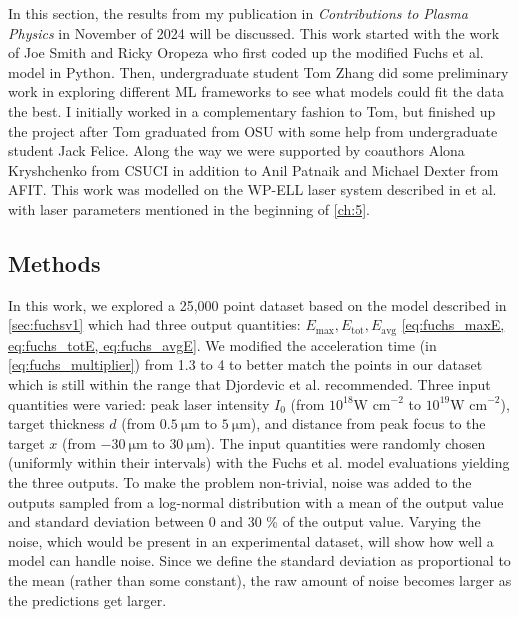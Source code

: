 In this section, the results from my publication in \emph{Contributions to Plasma Physics} \cite{Desai_2024_CPP} in November of 2024 will be discussed. This work started with the work of Joe Smith and Ricky Oropeza who first coded up the modified Fuchs et al. model in Python. Then, undergraduate student Tom Zhang did some preliminary work in exploring different \gls{ML} frameworks to see what models could fit the data the best. I initially worked in a complementary fashion to Tom, but finished up the project after Tom graduated from OSU with some help from undergraduate student Jack Felice. Along the way we were supported by coauthors Alona Kryshchenko from \gls{CSUCI} in addition to Anil Patnaik and Michael Dexter from \gls{AFIT}. This work was modelled on the \gls{WP-ELL} laser system described in et al. \cite{George_2019_HPLSE} with laser parameters mentioned in the beginning of \autoref{ch:5}.

\subsection{Methods}
In this work, we explored a 25,000 point dataset based on the model described in \autoref{sec:fuchsv1} which had three output quantities: $E_\text{max}, E_\text{tot}, E_\text{avg}$ \autoref{eq:fuchs_maxE, eq:fuchs_totE, eq:fuchs_avgE}. We modified the acceleration time (in \autoref{eq:fuchs_multiplier}) from 1.3 to 4 to better match the points in our dataset which is still within the range that Djordevic et al. \cite{Djordjevic_2021_PPCF} recommended.  Three input quantities were varied: peak laser intensity $I_0$ (from  $10^{18} \text{W cm}^{-2}$ to $10^{19} \text{W cm}^{-2}$), target thickness $d$ (from $\SI{0.5}{\micro \meter}$ to $\SI{5}{\micro \meter}$), and distance from peak focus to the target $x$ (from $\SI{-30}{\micro \meter}$ to $\SI{30}{\micro \meter}$). The input quantities were randomly chosen (uniformly within their intervals) with the Fuchs et al. model evaluations yielding the three outputs. To make the problem non-trivial, noise was added to the outputs sampled from a log-normal distribution with a mean of the output value and standard deviation between 0 and 30 \% of the output value. Varying the noise, which would be present in an experimental dataset, will show how well a model can handle noise. Since we define the standard deviation as proportional to the mean (rather than some constant), the raw amount of noise becomes larger as the predictions get larger.

